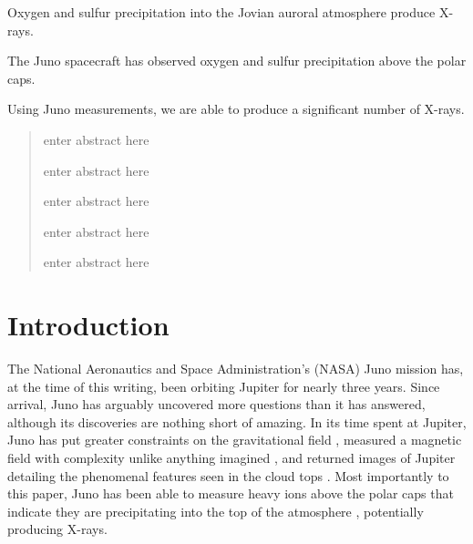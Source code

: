 \documentclass[draft]{agujournal2018}
\begin{document}
\begin{keypoints}
\item Oxygen and sulfur precipitation into the Jovian auroral atmosphere produce X-rays.
\item The Juno spacecraft has observed oxygen and sulfur precipitation above the polar caps.
\item Using Juno measurements, we are able to produce a significant number of X-rays.
\end{keypoints}

%
%


\begin{abstract}
enter abstract here


enter abstract here


enter abstract here


enter abstract here


enter abstract here

\end{abstract}



%
%

\section{Introduction}

The National Aeronautics and Space Administration's (NASA) Juno mission has, at the time of this writing, been orbiting Jupiter for nearly three years.
Since arrival, Juno has arguably uncovered more questions than it has answered, although its discoveries are nothing short of amazing.
In its time spent at Jupiter, Juno has put greater constraints on the gravitational field \citep{folkner2017,iess2018}, measured a magnetic field with complexity unlike anything imagined \citep{connerney2017,connerney2018,moore2018}, and returned images of Jupiter detailing the phenomenal features seen in the cloud tops \citep{orton2017,sanchez2018}.
Most importantly to this paper, Juno has been able to measure heavy ions above the polar caps that indicate they are precipitating into the top of the atmosphere \citep{haggerty2017,clark2017a,clark2017b}, potentially producing X-rays.
\end{document}
